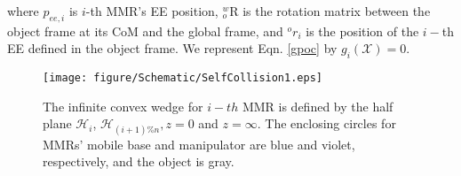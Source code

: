 where $p_{ee,i}$ is $i$-th MMR's EE position, ${}^w_o\textrm{R}$ is the rotation matrix between the object frame at its CoM and the global frame, and $^or_i$ is the position of the $i-$th EE defined in the object frame. We represent Eqn. \eqref{gpoc} by $g_i(\mathcal{X}) = 0$.

\begin{figure}[htbp]
\centerline{\texttt{[image: figure/Schematic/SelfCollision1.eps]}}
\caption{The infinite convex wedge for $i-th$ MMR is defined by the half plane $\mathcal{H}_i$, $\mathcal{H}_{(i+1)\%n}, z=0$ and $z=\infty$. The enclosing circles for MMRs' mobile base and manipulator are blue and violet, respectively, and the object is gray.}
\label{fig:soa}
\end{figure}
